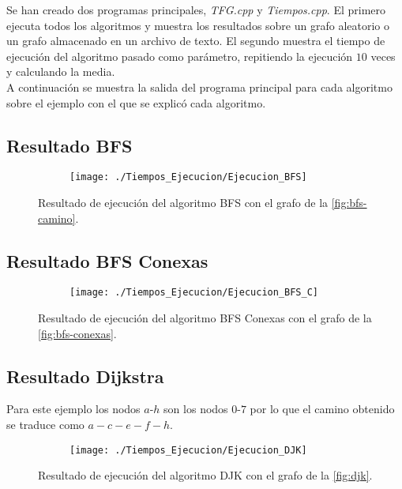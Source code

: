 Se han creado dos programas principales, \textit{TFG.cpp} y \textit{Tiempos.cpp}. El primero ejecuta todos los algoritmos y muestra los resultados sobre un grafo aleatorio o un grafo almacenado en un archivo de texto. El segundo muestra el tiempo de ejecución del algoritmo pasado como parámetro, repitiendo la ejecución $10$ veces y calculando la media. \\

A continuación se muestra la salida del programa principal para cada algoritmo sobre el ejemplo con el que se explicó cada algoritmo.

\subsection{Resultado BFS}

\begin{figure}[!htb]
	\centering
	\begin{subfigure}{\linewidth}
		\texttt{[image: ./Tiempos\_Ejecucion/Ejecucion\_BFS]}
	\end{subfigure}
	
	\caption{Resultado de ejecución del algoritmo BFS con el grafo de la \autoref{fig:bfs-camino}.}
	\label{fig:resultado_BFS}
\end{figure}

\subsection{Resultado BFS Conexas}

\begin{figure}[!htb]
	\centering
	\begin{subfigure}{\linewidth}
		\texttt{[image: ./Tiempos\_Ejecucion/Ejecucion\_BFS\_C]}
	\end{subfigure}
	
	\caption{Resultado de ejecución del algoritmo BFS Conexas con el grafo de la \autoref{fig:bfs-conexas}.}
	\label{fig:resultado_BFS_C}
\end{figure}

\subsection{Resultado Dijkstra}

Para este ejemplo los nodos $a$-$h$ son los nodos $0$-$7$ por lo que el camino obtenido se traduce como $a - c - e - f - h$.

\begin{figure}[!htb]
	\centering
	\begin{subfigure}{\linewidth}
		\texttt{[image: ./Tiempos\_Ejecucion/Ejecucion\_DJK]}
	\end{subfigure}
	
	\caption{Resultado de ejecución del algoritmo DJK con el grafo de la \autoref{fig:djk}.}
	\label{fig:resultado_DJK}
\end{figure}

